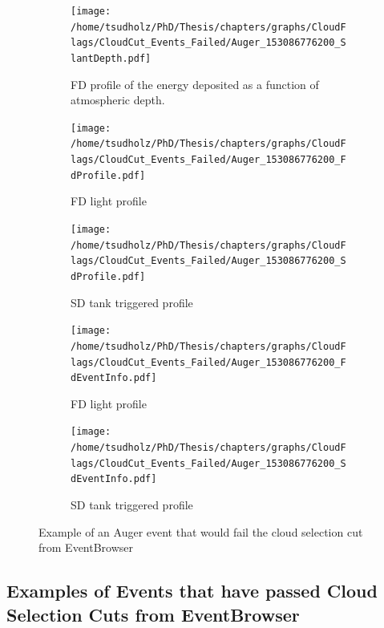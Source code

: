 \begin{figure}
\centering
 \vspace{2cm}
  \begin{subfigure}[b]{\textwidth}
  \centering
  \texttt{[image: /home/tsudholz/PhD/Thesis/chapters/graphs/CloudFlags/CloudCut\_Events\_Failed/Auger\_153086776200\_SlantDepth.pdf]}
  \caption{FD profile of the energy deposited as a function of atmospheric depth.}
  \end{subfigure}
 \vspace{0.5cm}
  \begin{subfigure}[b]{0.45\textwidth}
  	\centering
  	\texttt{[image: /home/tsudholz/PhD/Thesis/chapters/graphs/CloudFlags/CloudCut\_Events\_Failed/Auger\_153086776200\_FdProfile.pdf]}
  	\caption{FD light profile}
  \end{subfigure}
  \begin{subfigure}[b]{0.45\textwidth}
  	\centering
  	\texttt{[image: /home/tsudholz/PhD/Thesis/chapters/graphs/CloudFlags/CloudCut\_Events\_Failed/Auger\_153086776200\_SdProfile.pdf]}
  	\caption{SD tank triggered profile}
  \end{subfigure}

  \begin{subfigure}[b]{0.45\textwidth}
  	\centering
	\texttt{[image: /home/tsudholz/PhD/Thesis/chapters/graphs/CloudFlags/CloudCut\_Events\_Failed/Auger\_153086776200\_FdEventInfo.pdf]}
  	\caption{FD light profile}
  \end{subfigure}
  \begin{subfigure}[b]{0.45\textwidth}
  	\centering
	\texttt{[image: /home/tsudholz/PhD/Thesis/chapters/graphs/CloudFlags/CloudCut\_Events\_Failed/Auger\_153086776200\_SdEventInfo.pdf]}
  	\caption{SD tank triggered profile}
  \end{subfigure}
  \caption{Example of an Auger event that would fail the cloud selection cut from EventBrowser}
\end{figure}

\subsection{Examples of Events that have passed Cloud Selection Cuts from EventBrowser}


